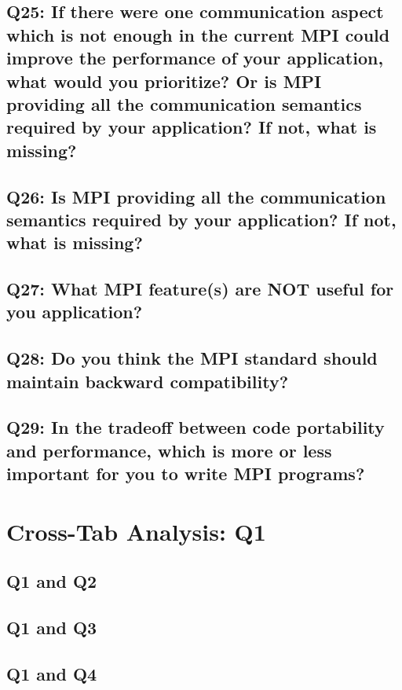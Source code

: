 \documentclass{report}
\begin{document}
\clearpage
\section{Q25: If there were one communication aspect which is not enough in the current MPI could improve the performance of your application, what would you prioritize? Or is MPI providing all the communication semantics required by your application? If not, what is missing?}\label{sec:q25}


\clearpage
\section{Q26: Is MPI providing all the communication semantics required by your application? If not, what is missing?}\label{sec:q26}


\clearpage
\section{Q27: What MPI feature(s) are NOT useful for you application?}\label{sec:q27}


\clearpage
\section{Q28: Do you think the MPI standard should maintain backward compatibility?}\label{sec:q28}


\clearpage
\section{Q29: In the tradeoff between code portability and performance, which is more or less important for you to write MPI programs?}\label{sec:q29}


\chapter{Cross-Tab Analysis: Q1}

\section{Q1 and Q2}\clearpage
\section{Q1 and Q3}\clearpage
\section{Q1 and Q4}\clearpage
\end{document}
